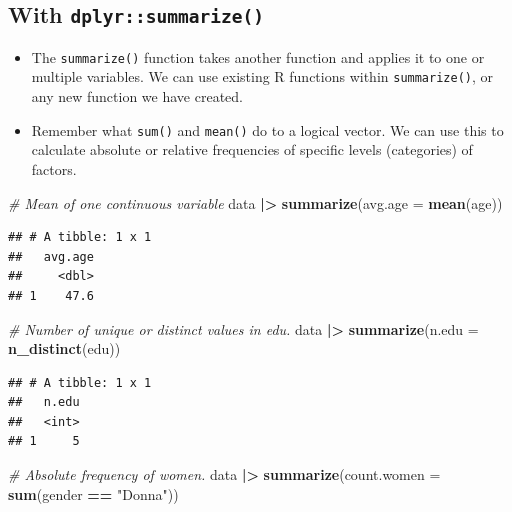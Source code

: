 \documentclass[
]{book}
\newenvironment{Shaded}{\begin{snugshade}}{\end{snugshade}}
\newcommand{\AttributeTok}[1]{\textcolor[rgb]{0.13,0.29,0.53}{#1}}
\newcommand{\CommentTok}[1]{\textcolor[rgb]{0.56,0.35,0.01}{\textit{#1}}}
\newcommand{\FunctionTok}[1]{\textcolor[rgb]{0.13,0.29,0.53}{\textbf{#1}}}
\newcommand{\NormalTok}[1]{#1}
\newcommand{\SpecialCharTok}[1]{\textcolor[rgb]{0.81,0.36,0.00}{\textbf{#1}}}
\newcommand{\StringTok}[1]{\textcolor[rgb]{0.31,0.60,0.02}{#1}}
\providecommand{\tightlist}{%
  \setlength{\itemsep}{0pt}\setlength{\parskip}{0pt}}
\begin{document}
\hypertarget{with-dplyrsummarize}{%
\subsection{\texorpdfstring{With \texttt{dplyr::summarize()}}{With dplyr::summarize()}}\label{with-dplyrsummarize}}

\begin{itemize}
\tightlist
\item
  The \texttt{summarize()} function takes another function and applies it to one or multiple variables. We can use existing R functions within \texttt{summarize()}, or any new function we have created.
\item
  Remember what \texttt{sum()} and \texttt{mean()} do to a logical vector. We can use this to calculate absolute or relative frequencies of specific levels (categories) of factors.
\end{itemize}

\begin{Shaded}
\begin{Highlighting}[]
\CommentTok{\# Mean of one continuous variable}
\NormalTok{data }\SpecialCharTok{|\textgreater{}} 
  \FunctionTok{summarize}\NormalTok{(}\AttributeTok{avg.age =} \FunctionTok{mean}\NormalTok{(age))}
\end{Highlighting}
\end{Shaded}

\begin{verbatim}
## # A tibble: 1 x 1
##   avg.age
##     <dbl>
## 1    47.6
\end{verbatim}

\begin{Shaded}
\begin{Highlighting}[]
\CommentTok{\# Number of unique or distinct values in edu.}
\NormalTok{data }\SpecialCharTok{|\textgreater{}} 
  \FunctionTok{summarize}\NormalTok{(}\AttributeTok{n.edu =} \FunctionTok{n\_distinct}\NormalTok{(edu))}
\end{Highlighting}
\end{Shaded}

\begin{verbatim}
## # A tibble: 1 x 1
##   n.edu
##   <int>
## 1     5
\end{verbatim}

\begin{Shaded}
\begin{Highlighting}[]
\CommentTok{\# Absolute frequency of women.}
\NormalTok{data }\SpecialCharTok{|\textgreater{}} 
  \FunctionTok{summarize}\NormalTok{(}\AttributeTok{count.women =} \FunctionTok{sum}\NormalTok{(gender }\SpecialCharTok{==} \StringTok{"Donna"}\NormalTok{))}
\end{Highlighting}
\end{Shaded}
\end{document}

